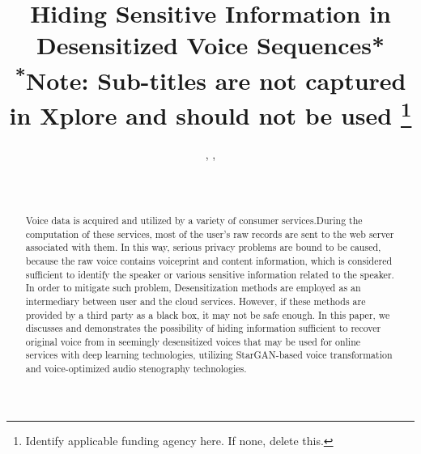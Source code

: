 \documentclass[journal]{IEEEtran} %
\begin{document}
\begin{CJK*}{UTF8}{gbsn}

\title{Hiding Sensitive Information in Desensitized Voice Sequences*\\
{\footnotesize \textsuperscript{*}Note: Sub-titles are not captured in Xplore and should not be used}
\thanks{Identify applicable funding agency here. If none, delete this.}
}

\author{%
    , %
    , %
    \\%
    \\%
    \\%
}

\maketitle

\begin{abstract}
Voice data is acquired and utilized by a variety of consumer services.During the computation of these services, most of the user's raw records are sent to the web server associated with them. In this way, serious privacy problems are bound to be caused, because the raw voice contains voiceprint and content information, which is considered sufficient to identify the speaker or various sensitive information related to the speaker. In order to mitigate such problem, Desensitization methods are employed as an intermediary between user and the cloud services. However, if these methods are provided by a third party as a black box, it may not be safe enough. In this paper, we discusses and demonstrates the possibility of hiding information sufficient to recover original voice from in seemingly desensitized voices that may be used for online services with deep learning technologies, utilizing StarGAN-based voice transformation and voice-optimized audio stenography technologies.
\end{abstract}


\end{CJK*}
\end{document}
